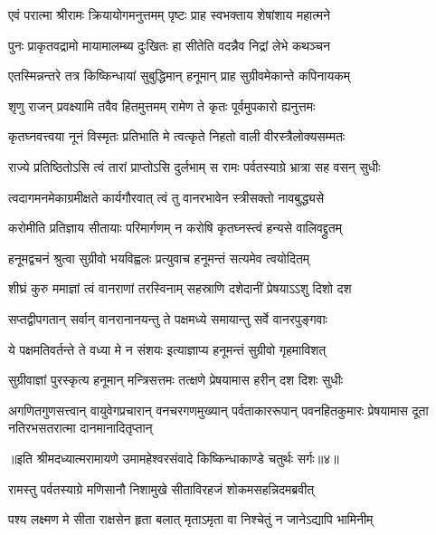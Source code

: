\twolineshloka
{एवं परात्मा श्रीरामः क्रियायोगमनुत्तमम्}
{पृष्टः प्राह स्वभक्ताय शेषांशाय महात्मने} %

\twolineshloka
{पुनः प्राकृतवद्रामो मायामालम्ब्य दुःखितः}
{हा सीतेति वदन्नैव निद्रां लेभे कथञ्चन} %

\twolineshloka
{एतस्मिन्नन्तरे तत्र किष्किन्धायां सुबुद्धिमान्}
{हनूमान् प्राह सुग्रीवमेकान्ते कपिनायकम्} %

\twolineshloka
{शृणु राजन् प्रवक्ष्यामि तवैव हितमुत्तमम्}
{रामेण ते कृतः पूर्वमुपकारो ह्यनुत्तमः} %

\twolineshloka
{कृतघ्नवत्त्वया नूनं विस्मृतः प्रतिभाति मे}
{त्वत्कृते निहतो वाली वीरस्त्रैलोक्यसम्मतः} %

\twolineshloka
{राज्ये प्रतिष्ठितोऽसि त्वं तारां प्राप्तोऽसि दुर्लभाम्}
{स रामः पर्वतस्याग्रे भ्रात्रा सह वसन् सुधीः} %

\twolineshloka
{त्वदागमनमेकाग्रमीक्षते कार्यगौरवात्}
{त्वं तु वानरभावेन स्त्रीसक्तो नावबुद्ध्यसे} %

\twolineshloka
{करोमीति प्रतिज्ञाय सीतायाः परिमार्गणम्}
{न करोषि कृतघ्नस्त्वं हन्यसे वालिवद्द्रुतम्} %

\twolineshloka
{हनूमद्वचनं श्रुत्वा सुग्रीवो भयविह्वलः}
{प्रत्युवाच हनूमन्तं सत्यमेव त्वयोदितम्} %

\twolineshloka
{शीघ्रं कुरु ममाज्ञां त्वं वानराणां तरस्विनाम्}
{सहस्राणि दशेदानीं प्रेषयाऽऽशु दिशो दश} %

\twolineshloka
{सप्तद्वीपगतान् सर्वान् वानरानानयन्तु ते}
{पक्षमध्ये समायान्तु सर्वे वानरपुङ्गवाः} %

\twolineshloka
{ये पक्षमतिवर्तन्ते ते वध्या मे न संशयः}
{इत्याज्ञाप्य हनूमन्तं सुग्रीवो गृहमाविशत्} %

\twolineshloka
{सुग्रीवाज्ञां पुरस्कृत्य हनूमान् मन्त्रिसत्तमः}
{तत्क्षणे प्रेषयामास हरीन् दश दिशः सुधीः} %

\fourlineindentedshloka
{अगणितगुणसत्त्वान् वायुवेगप्रचारान्}
{वनचरगणमुख्यान् पर्वताकाररूपान्}
{पवनहितकुमारः प्रेषयामास दूता\-}
{नतिरभसतरात्मा दानमानादितृप्तान्} %

{॥इति श्रीमदध्यात्मरामायणे उमामहेश्वरसंवादे किष्किन्धाकाण्डे
चतुर्थः सर्गः॥४॥
}




\twolineshloka
{रामस्तु पर्वतस्याग्रे मणिसानौ निशामुखे}
{सीताविरहजं शोकमसहन्निदमब्रवीत्} %

\twolineshloka
{पश्य लक्ष्मण मे सीता राक्षसेन हृता बलात्}
{मृताऽमृता वा निश्चेतुं न जानेऽद्यापि भामिनीम्} %

